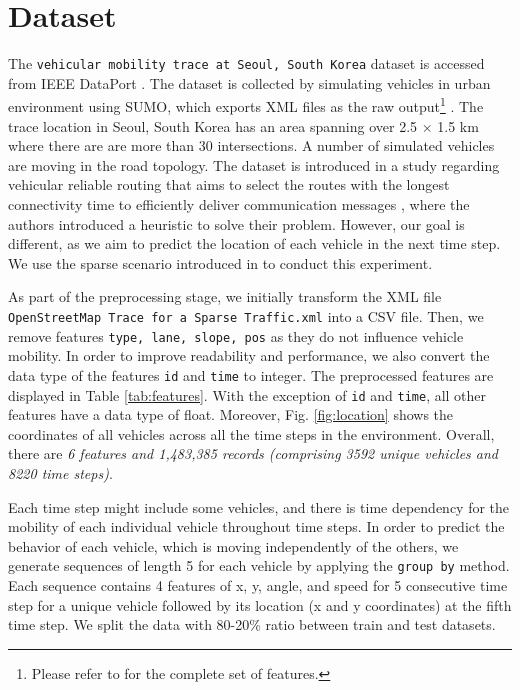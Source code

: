 \documentclass[conference]{IEEEtran}
\begin{document}
{\section{Dataset} \label{dataset}
The \texttt{vehicular mobility trace at Seoul, South Korea} dataset is accessed from IEEE DataPort \cite{dataset20kumbhar}. The dataset is collected by simulating vehicles in urban environment using SUMO, which exports XML files as the raw output\footnote{Please refer to \cite{sumo24fcd} for the complete set of features.} \cite{sumo24fcd}. The trace location in Seoul, South Korea has an area spanning over 2.5 × 1.5 km where there are are more than 30 intersections. A number of simulated vehicles are moving in the road topology. The dataset is introduced in a study regarding vehicular reliable routing that aims to select the routes with the longest connectivity time to efficiently deliver communication messages \cite{lcomm21kumbhar}, where the authors introduced a heuristic to solve their problem. However, our goal is different, as we aim to predict the location of each vehicle in the next time step. We use the sparse scenario introduced in \cite{dataset20kumbhar} to conduct this experiment.

As part of the preprocessing stage, we initially transform the XML file \texttt{OpenStreetMap Trace for a Sparse Traffic.xml} into a CSV file. Then, we remove features \texttt{type, lane, slope, pos} as they do not influence vehicle mobility. In order to improve readability and performance, we also convert the data type of the features \texttt{id} and \texttt{time} to integer. The preprocessed features are displayed in Table \ref{tab:features}. With the exception of \texttt{id} and \texttt{time}, all other features have a data type of float. Moreover, Fig. \ref{fig:location} shows the coordinates of all vehicles across all the time steps in the environment. Overall, there are \textit{6 features and 1,483,385 records (comprising 3592 unique vehicles and 8220 time steps)}. 

Each time step might include some vehicles, and there is time dependency for the mobility of each individual vehicle throughout time steps. In order to predict the behavior of each vehicle, which is moving independently of the others, we generate sequences of length 5 for each vehicle by applying the \texttt{group by} method. Each sequence contains 4 features of x, y, angle, and speed for 5 consecutive time step for a unique vehicle followed by its location (x and y coordinates) at the fifth time step. We split the data with 80-20\% ratio between train and test datasets.

}
\end{document}
